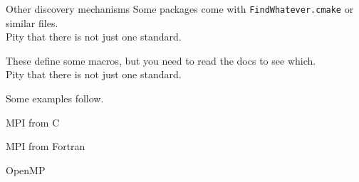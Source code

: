 
\lstset{language=bash}

\begin{numberedframe}{Other discovery mechanisms}
  Some packages come with \texttt{FindWhatever.cmake}
  or similar files.\\
  Pity that there is not just one standard.

  These define some macros, but you need to read the docs
  to see which.\\
  Pity that there is not just one standard.

  Some examples follow.
\end{numberedframe}

\begin{numberedframe}{MPI from C}
  \tiny
  \lstset{numbers=left,numberstyle=\tiny}
  
\end{numberedframe}

\begin{numberedframe}{MPI from Fortran}
  \tiny
  \lstset{numbers=left,numberstyle=\tiny}
  
\end{numberedframe}

\begin{numberedframe}{OpenMP}
  \lstset{numbers=left,numberstyle=\tiny}
  
\end{numberedframe}

